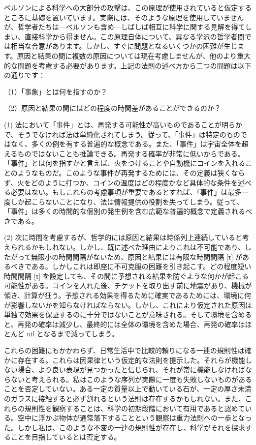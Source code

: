 \documentclass[a4paper,11pt,openany]{ltjsbook}
\begin{document}
ベルソンによる科学への大部分の攻撃は、この原理が使用されていると仮定するところに基礎を置いています。実際には、そのような原理を使用していませんが、哲学者たちは—ベルソンも含め—しばしば相互に科学に関する見解を得てしまい、直接科学から得ません。この原理自体について、異なる学派の哲学者間では相当な合意があります。しかし、すぐに問題となるいくつかの困難が生じます。原因と結果の間に複数の原因については現在考慮しませんが、他のより重大的な問題を考慮する必要があります。上記の法則の述べ方から二つの問題は以下の通りです：

（1）「事象」とは何を指すのか？

（2）原因と結果の間にはどの程度の時間差があることができるのか？

(1) 法において「事件」とは、再発する可能性が高いものであることが明らかで、そうでなければ法は単純化されてしまう。従って、「事件」は特定のものではなく、多くの例を有する普遍的な概念である。また、「事件」は宇宙全体を超えるものではないことも推論できる。再発する確率が非常に低いからである。「事件」とは何を指すかと言えば、火をつけることや自動機にコインを入れることのようなものだ。このような事件が再発するためには、その定義は狭くならず、火をどのように打つか、コインの温度はどの程度かなど具体的な条件を述べる必要はない。もしこれらの考慮事項が重要であるとすれば、「事件」は最多一度しか起こらないことになり、法は情報提供の役割を失ってしまう。従って、「事件」は多くの時間的な個別の発生例を含む広範な普遍的概念で定義されるべきである。

(2) 次に時間を考慮するが、哲学的には原因と結果は時係列上連続していると考えられるかもしれない。しかし、既に述べた理由によりこれは不可能であり、したがって無限小の時間間隔がないため、原因と結果には有限な時間間隔 [τ] があるべきである。しかしこれは即座に不可克服の困難を引き起こす。どの程度短い時間間隔 [τ] を設定しても、その間に予想される結果を防ぐような何かが起こる可能性がある。コインを入れた後、チケットを取り出す前に地震があり、機械が傾き、計算が狂う。予想される効果を得るために確実であるためには、環境に何が影響しないかを知らなければならない。しかし、これにより仮定された原因は単独で効果を保証するのに十分ではないことが意味される。そして環境を含めると、再発の確率は減少し、最終的には全体の環境を含めた場合、再発の確率はほとんど nil となるまで減ってしまう。

これらの困難にもかかわらず、日常生活中で比較的頼りになる一連の規則性は確かに存在する。これらは因果律という仮定的な法則を提示した。それらが機能しない場合、より良い表現が見つかったと信じられ、それが常に機能しなければならないと考えられる。私はこのような序列が実際に一度も失敗しないものがあることを否定していない。ある一定の質量以上で動いている石が、一定の厚さ未満のガラスに接触すると必ず割れるという法則は存在するかもしれない。また、これらの規則性を観察することは、科学の初期段階において有用であると認めている。空中に浮かぶ物体が通常落下することという観察は重力法則への一歩となった。しかし私は、このような不変の一連の規則性が存在し、科学がそれを探求することを目指しているとは否定する。
\end{document}
